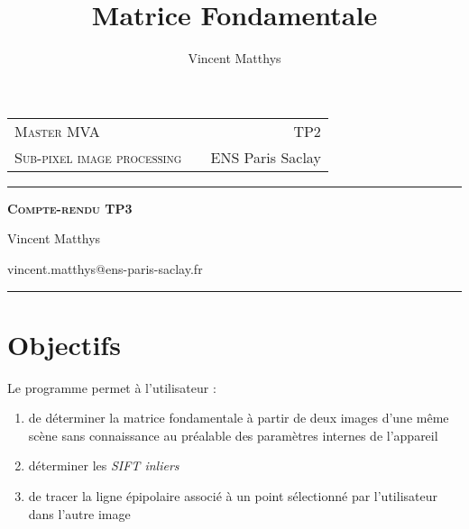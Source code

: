 \documentclass[12pt,a4paper,onecolumn]{article}
\title{Matrice Fondamentale}
\author{Vincent Matthys}
\begin{document}
\begin{tabularx}{0.9\textwidth}{@{} l X r @{} }
	{\textsc{Master MVA}}               &  & \textsc{TP2}       \\
	\textsc{Sub-pixel image processing} &  & {ENS Paris Saclay} \\
\end{tabularx}
\vspace{1.5cm}
\begin{center}

	\rule[11pt]{5cm}{0.5pt}

	\textbf{\LARGE \textsc{Compte-rendu TP3}}
	\vspace{0.5cm}

	Vincent Matthys

	vincent.matthys@ens-paris-saclay.fr

	\rule{5cm}{0.5pt}

	\vspace{1.5cm}
\end{center}

\section{Objectifs}
Le programme permet à l'utilisateur :
\begin{enumerate}
	\item de déterminer la matrice fondamentale à partir de deux images d'une même scène sans connaissance au préalable des paramètres internes de l'appareil
	\item déterminer les \textit{SIFT inliers}
	\item de tracer la ligne épipolaire associé à un point sélectionné par l'utilisateur dans l'autre image
\end{enumerate}
\end{document}
